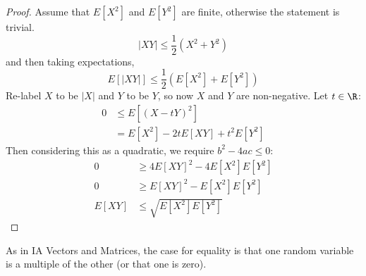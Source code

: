 \documentclass[../Main.tex]{subfiles}
\begin{document}
\begin{proof}
    Assume that $E[X^2]$ and $E[Y^2]$ are finite, otherwise the statement is trivial.
    \begin{equation*}
        |XY| \leq \frac{1}{2} \left(X^2 + Y^2\right)
    \end{equation*}
    and then taking expectations,
    \begin{equation*}
        E[|XY|] \leq \frac{1}{2}\left(E[X^2] + E[Y^2]\right)
    \end{equation*}
    Re-label $X$ to be $|X|$ and $Y$ to be $Y$, so now $X$ and $Y$ are non-negative. Let $t \in \R$:
    \begin{align*}
        0 &\leq E\left[(X - tY)^2\right] \\
        &= E[X^2] - 2tE[XY] + t^2 E[Y^2]
    \end{align*}
    Then considering this as a quadratic, we require $b^2 - 4ac \leq 0$:
    \begin{align*}
        0 &\geq 4E[XY]^2 - 4E[X^2] E[Y^2] \\
        0 &\geq E[XY]^2 - E[X^2] E[Y^2] \\
        E[XY] &\leq \sqrt{E[X^2]E[Y^2]}
    \end{align*}
\end{proof}
\begin{remark}
    As in IA Vectors and Matrices, the case for equality is that one random variable is a multiple of the other (or that one is zero).
\end{remark}
\end{document}
